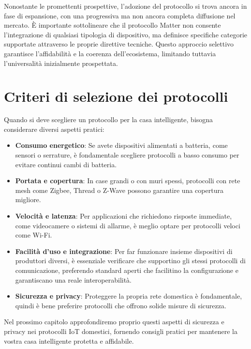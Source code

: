 Nonostante le promettenti prospettive, l'adozione del protocollo si trova ancora in fase di espansione, con una progressiva ma non ancora completa diffusione nel mercato. È importante sottolineare che il protocollo Matter non consente l'integrazione di qualsiasi tipologia di dispositivo, ma definisce specifiche categorie supportate attraverso le proprie direttive tecniche. Questo approccio selettivo garantisce l'affidabilità e la coerenza dell'ecosistema, limitando tuttavia l'universalità inizialmente prospettata.

\section{Criteri di selezione dei protocolli}
Quando si deve scegliere un protocollo per la casa intelligente, bisogna considerare diversi aspetti pratici:
\begin{itemize}
    \item \textbf{Consumo energetico}: Se avete dispositivi alimentati a batteria, come sensori o serrature, è fondamentale scegliere protocolli a basso consumo per evitare continui cambi di batteria.
    \item \textbf{Portata e copertura}: In case grandi o con muri spessi, protocolli con rete mesh come Zigbee, Thread o Z-Wave possono garantire una copertura migliore.
    \item \textbf{Velocità e latenza}: Per applicazioni che richiedono risposte immediate, come videocamere o sistemi di allarme, è meglio optare per protocolli veloci come Wi-Fi.
    \item \textbf{Facilità d'uso e integrazione}: Per far funzionare insieme dispositivi di produttori diversi, è essenziale verificare che supportino gli stessi protocolli di comunicazione, preferendo standard aperti che facilitino la configurazione e garantiscano una reale interoperabilità.
    \item \textbf{Sicurezza e privacy}: Proteggere la propria rete domestica è fondamentale, quindi è bene preferire protocolli che offrono solide misure di sicurezza.
\end{itemize}

Nel prossimo capitolo approfondiremo proprio questi aspetti di sicurezza e privacy nei protocolli IoT domestici, fornendo consigli pratici per mantenere la vostra casa intelligente protetta e affidabile.
